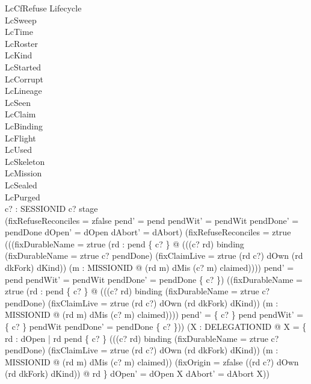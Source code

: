 \documentclass[a4paper,10pt,fleqn]{article}
\begin{document}
\begin{schema}{LcCfRefuse}
\Delta Lifecycle \\
\Xi LcSweep \\
\Xi LcTime \\
\Xi LcRoster \\
\Xi LcKind \\
\Xi LcStarted \\
\Xi LcCorrupt \\
\Xi LcLineage \\
\Xi LcSeen \\
\Xi LcClaim \\
\Xi LcBinding \\
\Xi LcFlight \\
\Xi LcUsed \\
\Xi LcSkeleton \\
\Xi LcMission \\
\Xi LcSealed \\
\Xi LcPurged \\
c? : SESSIONID
\where
c? \notin \dom stage \\
(fixRefuseReconciles = zfalse \land pend' = pend \land pendWit' = pendWit \land pendDone' = pendDone \land dOpen' = dOpen \land dAbort' = dAbort) \lor (fixRefuseReconciles = ztrue \land (((fixDurableName = ztrue \land (\exists rd : pend \limg \{ c? \} \rimg @ (((c? \mapsto rd) \in binding \lor (fixDurableName = ztrue \land c? \in pendDone) \lor (fixClaimLive = ztrue \land (rd \mapsto c?) \in dOwn \land (rd \mapsto dkFork) \in dKind)) \land (\exists m : MISSIONID @ (rd \mapsto m) \in dMis \land (c? \mapsto m) \in claimed)))) \land pend' = pend \land pendWit' = pendWit \land pendDone' = pendDone \cup \{ c? \}) \lor (\lnot (fixDurableName = ztrue \land (\exists rd : pend \limg \{ c? \} \rimg @ (((c? \mapsto rd) \in binding \lor (fixDurableName = ztrue \land c? \in pendDone) \lor (fixClaimLive = ztrue \land (rd \mapsto c?) \in dOwn \land (rd \mapsto dkFork) \in dKind)) \land (\exists m : MISSIONID @ (rd \mapsto m) \in dMis \land (c? \mapsto m) \in claimed)))) \land pend' = \{ c? \} \ndres pend \land pendWit' = \{ c? \} \ndres pendWit \land pendDone' = pendDone \setminus \{ c? \})) \land (\exists X : \power DELEGATIONID @ X = \{ rd : dOpen | rd \in pend \limg \{ c? \} \rimg \land \lnot (((c? \mapsto rd) \in binding \lor (fixDurableName = ztrue \land c? \in pendDone) \lor (fixClaimLive = ztrue \land (rd \mapsto c?) \in dOwn \land (rd \mapsto dkFork) \in dKind)) \land (\exists m : MISSIONID @ (rd \mapsto m) \in dMis \land (c? \mapsto m) \in claimed)) \land (fixOrigin = zfalse \lor ((rd \mapsto c?) \in dOwn \land (rd \mapsto dkFork) \in dKind)) @ rd \} \land dOpen' = dOpen \setminus X \land dAbort' = dAbort \cup X)) \\

\end{schema}
\end{document}
